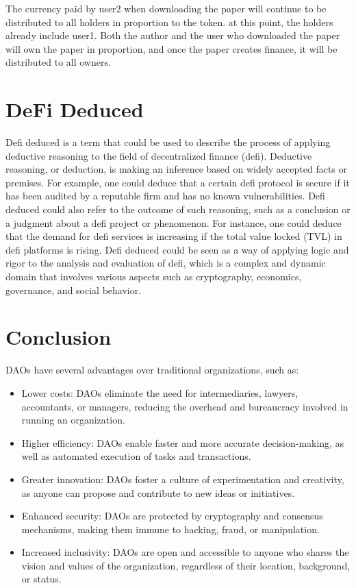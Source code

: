 \documentclass[lettersize,journal]{IEEEtran}
\begin{document}
The currency paid by user2 when downloading the paper will continue to be distributed to all holders in proportion to the token. at this point, the holders already include user1. Both the author and the user who downloaded the paper will own the paper in proportion, and once the paper creates finance, it will be distributed to all owners.

\section{DeFi Deduced}

Defi deduced is a term that could be used to describe the process of applying deductive reasoning to the field of decentralized finance (defi). Deductive reasoning, or deduction, is making an inference based on widely accepted facts or premises. For example, one could deduce that a certain defi protocol is secure if it has been audited by a reputable firm and has no known vulnerabilities. Defi deduced could also refer to the outcome of such reasoning, such as a conclusion or a judgment about a defi project or phenomenon. For instance, one could deduce that the demand for defi services is increasing if the total value locked (TVL) in defi platforms is rising. Defi deduced could be seen as a way of applying logic and rigor to the analysis and evaluation of defi, which is a complex and dynamic domain that involves various aspects such as cryptography, economics, governance, and social behavior.


\section{Conclusion}


DAOs have several advantages over traditional organizations, such as:

\begin{itemize}
\item{Lower costs: DAOs eliminate the need for intermediaries, lawyers, accountants, or managers, reducing the overhead and bureaucracy involved in running an organization.}
\item{Higher efficiency: DAOs enable faster and more accurate decision-making, as well as automated execution of tasks and transactions.}
\item{Greater innovation: DAOs foster a culture of experimentation and creativity, as anyone can propose and contribute to new ideas or initiatives.}
\item{Enhanced security: DAOs are protected by cryptography and consensus mechanisms, making them immune to hacking, fraud, or manipulation.}
\item{Increased inclusivity: DAOs are open and accessible to anyone who shares the vision and values of the organization, regardless of their location, background, or status.}
\end{itemize}
\end{document}
